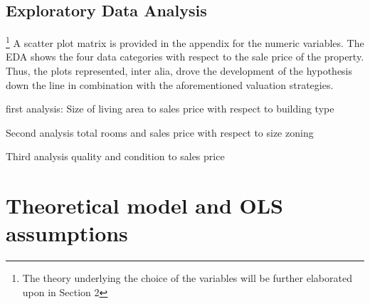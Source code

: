 \documentclass{article}
\begin{document}
\subsection{Exploratory Data Analysis}\footnote{The theory underlying the choice of the variables will be further elaborated upon in Section 2}
A scatter plot matrix is provided in the appendix for the numeric variables. The EDA shows the four data categories with respect to the sale price of the property. Thus, the plots represented, inter alia, drove the development of the hypothesis down the line in combination with the aforementioned valuation strategies. 



first analysis:
Size of living area to sales price with respect to building type

Second analysis
total rooms and sales price with respect to size zoning

Third analysis
quality and condition to sales price



\section{Theoretical model and OLS assumptions}




\begin{center}
\end{center}
\end{document}
